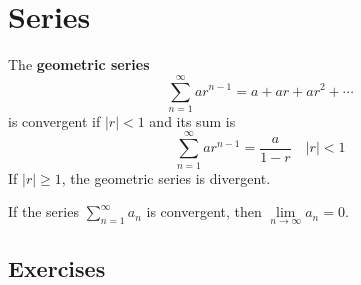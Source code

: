 \section{Series}
\setcounter{theorem}{3}
\begin{theorem}
	The \textbf{geometric series}
	\begin{equation}
	\sum_{n=1}^{\infty} ar^{n-1} = a + ar + ar^2 + \cdots
	\end{equation}
	is convergent if $\left|r\right|<1$ and its sum is
	\begin{equation*}
	\sum_{n=1}^{\infty} ar^{n-1} = \frac{a}{1-r}\quad\left|r\right|<1
	\end{equation*}
	If $\left|r\right|\geq 1$, the geometric series is divergent.
\end{theorem}
\setcounter{theorem}{5}
\begin{theorem}
	If the series $\sum_{n=1}^{\infty} a_n$ is convergent, then $\lim\limits_{n\to\infty} a_n=0$.
\end{theorem}

\subsection{Exercises}

